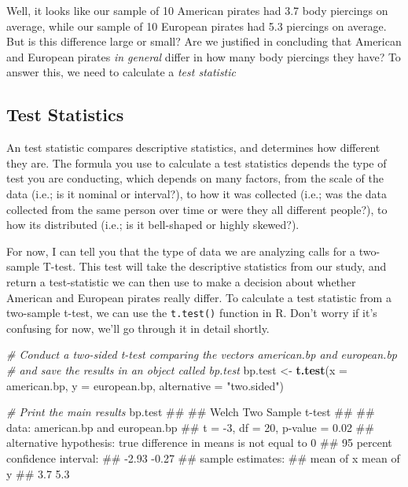 \documentclass[]{book}
\newenvironment{Shaded}{\begin{snugshade}}{\end{snugshade}}
\newcommand{\KeywordTok}[1]{\textcolor[rgb]{0.13,0.29,0.53}{\textbf{#1}}}
\newcommand{\DataTypeTok}[1]{\textcolor[rgb]{0.13,0.29,0.53}{#1}}
\newcommand{\StringTok}[1]{\textcolor[rgb]{0.31,0.60,0.02}{#1}}
\newcommand{\CommentTok}[1]{\textcolor[rgb]{0.56,0.35,0.01}{\textit{#1}}}
\newcommand{\NormalTok}[1]{#1}
\theoremstyle{definition}
\theoremstyle{definition}
\theoremstyle{remark}
\begin{document}
Well, it looks like our sample of 10 American pirates had 3.7 body
piercings on average, while our sample of 10 European pirates had 5.3
piercings on average. But is this difference large or small? Are we
justified in concluding that American and European pirates \emph{in
general} differ in how many body piercings they have? To answer this, we
need to calculate a \emph{test statistic}

\subsection{Test Statistics}\label{test-statistics}

An test statistic compares descriptive statistics, and determines how
different they are. The formula you use to calculate a test statistics
depends the type of test you are conducting, which depends on many
factors, from the scale of the data (i.e.; is it nominal or interval?),
to how it was collected (i.e.; was the data collected from the same
person over time or were they all different people?), to how its
distributed (i.e.; is it bell-shaped or highly skewed?).

For now, I can tell you that the type of data we are analyzing calls for
a two-sample T-test. This test will take the descriptive statistics from
our study, and return a test-statistic we can then use to make a
decision about whether American and European pirates really differ. To
calculate a test statistic from a two-sample t-test, we can use the
\texttt{t.test()} function in R. Don't worry if it's confusing for now,
we'll go through it in detail shortly.

\begin{Shaded}
\begin{Highlighting}[]
\CommentTok{# Conduct a two-sided t-test comparing the vectors american.bp and european.bp}
\CommentTok{#  and save the results in an object called bp.test}
\NormalTok{bp.test <-}\StringTok{ }\KeywordTok{t.test}\NormalTok{(}\DataTypeTok{x =}\NormalTok{ american.bp,}
                  \DataTypeTok{y =}\NormalTok{ european.bp,}
                  \DataTypeTok{alternative =} \StringTok{"two.sided"}\NormalTok{)}

\CommentTok{# Print the main results}
\NormalTok{bp.test}
\NormalTok{## }
\NormalTok{##  Welch Two Sample t-test}
\NormalTok{## }
\NormalTok{## data:  american.bp and european.bp}
\NormalTok{## t = -3, df = 20, p-value = 0.02}
\NormalTok{## alternative hypothesis: true difference in means is not equal to 0}
\NormalTok{## 95 percent confidence interval:}
\NormalTok{##  -2.93 -0.27}
\NormalTok{## sample estimates:}
\NormalTok{## mean of x mean of y }
\NormalTok{##       3.7       5.3}
\end{Highlighting}
\end{Shaded}
\end{document}
